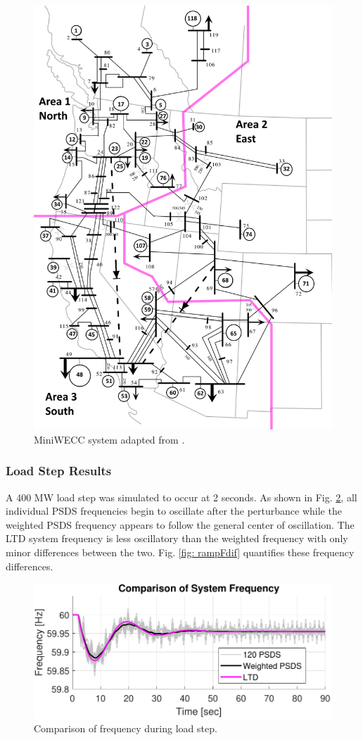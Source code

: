\begin{figure}[!ht]
	\centering
	\includegraphics[width=.65\linewidth]{figures/miniWECC_split03}
	\caption{MiniWECC system adapted from \cite{RJminiWECC}.}
	\label{fig: miniWECC}
\end{figure}

\subsubsection{Load Step Results}
A 400 MW load step was simulated to occur at 2 seconds.
As shown in Fig. \ref{fig: stepFcomp}, all individual PSDS frequencies begin to oscillate after the perturbance while the weighted PSDS frequency appears to follow the general center of oscillation. The LTD system frequency is less oscillatory than the weighted frequency with only minor differences between the two. Fig. \ref{fig: rampFdif} quantifies these frequency differences.

\begin{figure}[!t]
	\centering
	\includegraphics[width=\linewidth]{figures/miniWECC3ALTDstepF3}
	\caption{Comparison of frequency during load step.}
	\label{fig: stepFcomp}
\end{figure}

